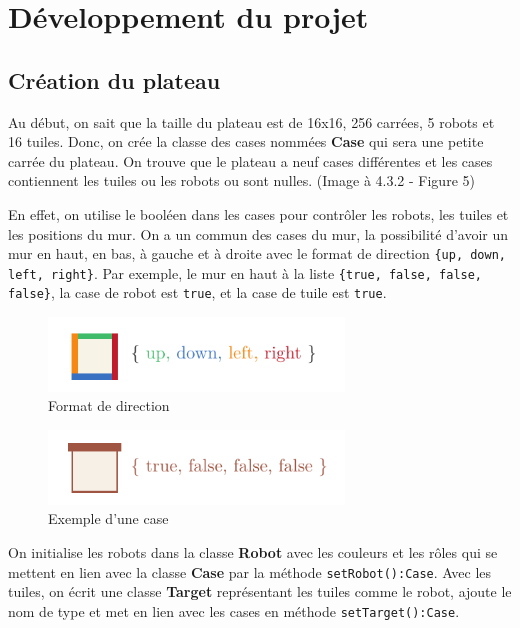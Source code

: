 \documentclass[12pt, pdflatex]{article}
\begin{document}
\pagebreak

\section{Développement du projet}

    \subsection{Création du plateau}
    Au début, on sait que la taille du plateau est de 16x16, 256 carrées, 5 robots et 16 tuiles. Donc, on crée la classe des cases nommées \textbf{Case} qui sera une petite carrée du plateau. On trouve que le plateau a neuf cases différentes et les cases contiennent les tuiles ou les robots ou sont nulles. (Image à 4.3.2 - Figure 5)
    
    En effet, on utilise le booléen dans les cases pour contrôler les robots, les tuiles et les positions du mur. On a un commun des cases du mur, la possibilité d'avoir un mur en haut, en bas, à gauche et à droite avec le format de direction \texttt{\{up, down, left, right\}}. Par exemple, le mur en haut à la liste \texttt{\{true, false, false, false\}}, la case de robot est \texttt{true}, et la case de tuile est \texttt{true}. 
    
    \begin{figure}[H]
        \centering
        \includegraphics[width=0.7\textwidth]{sources/case-wall-ex.pdf}
        \caption{Format de direction}
    \end{figure}


    \begin{figure}[H]
        \centering
        \includegraphics[width=0.7\textwidth]{sources/case-wall-ex2.pdf}
        \caption{Exemple d'une case}
    \end{figure}
    
    On initialise les robots dans la classe \textbf{Robot} avec les couleurs et les rôles qui se mettent en lien avec la classe \textbf{Case} par la méthode \texttt{setRobot():Case}. Avec les tuiles, on écrit une classe \textbf{Target} représentant les tuiles comme le robot, ajoute le nom de type et met en lien avec les cases en méthode \texttt{setTarget():Case}.
    
\end{document}

